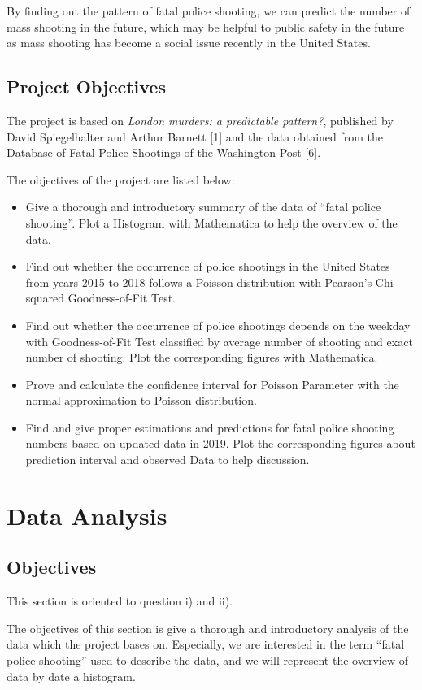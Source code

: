 \documentclass[a4paper]{article}
\begin{document}
By finding out the pattern of fatal police shooting, we can predict the number of mass shooting in the future, which may be helpful to public safety in the future as mass shooting has become a social issue recently in the United States.

\subsection{Project Objectives}
The project is based on \textit{London murders: a predictable pattern?}, published by David Spiegelhalter and Arthur Barnett [1] and the data obtained from the Database of Fatal Police Shootings of the Washington Post [6].

The objectives of the project are listed below:
\begin{itemize}
\item Give a thorough and introductory summary of the data of ``fatal police shooting''. Plot a Histogram with Mathematica to help the overview of the data.
\item Find out whether the occurrence of police shootings in the United States from years 2015 to 2018 follows a Poisson distribution with Pearson's Chi-squared Goodness-of-Fit Test.
\item Find out whether the occurrence of police shootings depends on the weekday with Goodness-of-Fit Test classified by average number of shooting and exact number of shooting. Plot the corresponding figures with Mathematica.
\item Prove and calculate the confidence interval for Poisson Parameter with the normal approximation to Poisson distribution.
\item Find and give proper estimations and predictions for fatal police shooting numbers based on updated data in 2019. Plot the corresponding figures about prediction interval and observed Data to help discussion.
\end{itemize}


\newpage

\section{Data Analysis}
\subsection{Objectives}
This section is oriented to question i) and ii).

The objectives of this section is give a thorough and introductory analysis of the data which the project bases on. Especially, we are interested in the term ``fatal police shooting'' used to describe the data, and we will represent the overview of data by date a histogram.
\end{document}

